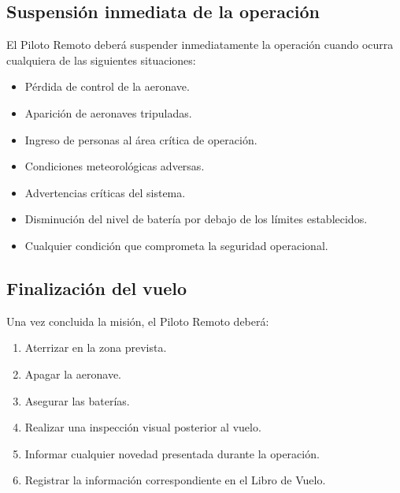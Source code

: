 \subsection{Suspensión inmediata de la operación}

El Piloto Remoto deberá suspender inmediatamente la operación cuando ocurra cualquiera de las siguientes situaciones:

\begin{itemize}

\item Pérdida de control de la aeronave.

\item Aparición de aeronaves tripuladas.

\item Ingreso de personas al área crítica de operación.

\item Condiciones meteorológicas adversas.

\item Advertencias críticas del sistema.

\item Disminución del nivel de batería por debajo de los límites establecidos.

\item Cualquier condición que comprometa la seguridad operacional.

\end{itemize}

\subsection{Finalización del vuelo}

Una vez concluida la misión, el Piloto Remoto deberá:

\begin{enumerate}

\item Aterrizar en la zona prevista.

\item Apagar la aeronave.

\item Asegurar las baterías.

\item Realizar una inspección visual posterior al vuelo.

\item Informar cualquier novedad presentada durante la operación.

\item Registrar la información correspondiente en el Libro de Vuelo.

\end{enumerate}

